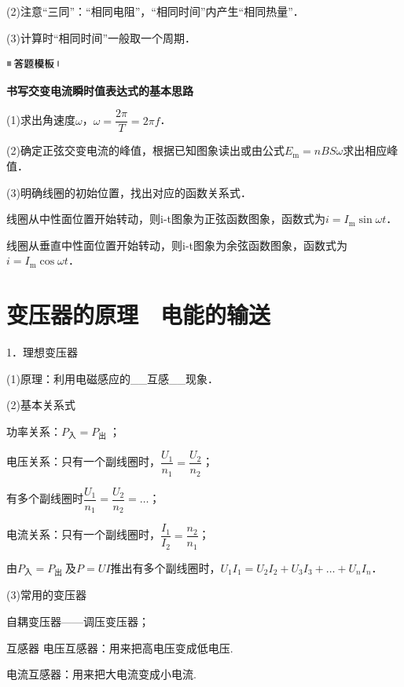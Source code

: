 (2)注意``三同''：``相同电阻''，``相同时间''内产生``相同热量''．

(3)计算时``相同时间''一般取一个周期．

\begin{center}\includegraphics[width=0.70764in,height=0.12292in]{media/image25.png}\end{center}
\begin{center}
	\textbf{书写交变电流瞬时值表达式的基本思路}
\end{center}


(1)求出角速度$\omega$，$\omega=\dfrac{2 \pi}{T}=2 \pi f$．

(2)确定正弦交变电流的峰值，根据已知图象读出或由公式$E_{\mathrm{m}}=n B S \omega$求出相应峰值．

(3)明确线圈的初始位置，找出对应的函数关系式．

线圈从中性面位置开始转动，则i-t图象为正弦函数图象，函数式为$i=I_{\mathrm{m}} \sin \omega t$．

线圈从垂直中性面位置开始转动，则i-t图象为余弦函数图象，函数式为$i=I_{\mathrm{m}} \cos \omega t$．
\newpage
\section{变压器的原理　电能的输送}

1．理想变压器

(1)原理：利用电磁感应的\_\_互感\_\_现象．

(2)基本关系式

功率关系：$P_{\text{入}}=P_{\text {出 }}$；

电压关系：只有一个副线圈时，$\dfrac{U_{1}}{n_{1}}=\dfrac{U_{2}}{n_{2}}$；

有多个副线圈时$\dfrac{U_{1}}{n_{1}}=\dfrac{U_{2}}{n_{2}}=\ldots$；

电流关系：只有一个副线圈时，$\dfrac{I_{1}}{I_{2}}=\dfrac{n_{2}}{n_{1}}$；

由$P_{\text{入}}=P_{\text {出 }}$及$P=UI$推出有多个副线圈时，$U_{1} I_{1}=U_{2} I_{2}+U_{3} I_{3}+\ldots+U_{n} I_{n}$．

(3)常用的变压器

自耦变压器------调压变压器；

互感器
电压互感器：用来把高电压变成低电压.

电流互感器：用来把大电流变成小电流.


